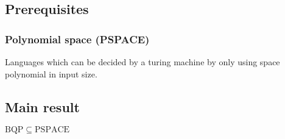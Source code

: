 \documentclass[../main.tex]{subfiles}
\begin{document}
\subsection{Prerequisites}

\subsubsection{Polynomial space (PSPACE)}

Languages which can be decided by a turing machine by only using space polynomial in input size.

\subsection{Main result}

\begin{theorem}
$\mathrm{BQP}\subseteq\mathrm{PSPACE}$ \cite{ADH97}
\end{theorem}
\end{document}
